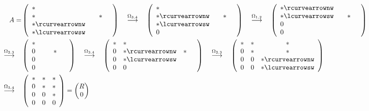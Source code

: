 \begin{align*}
A= &
\left(\begin{array}{lccc}
*~ &&&\\
* &&* \\
* \rcurvearrownw \\ * \lcurvearrowsw
\end{array}\right)
\quad \overset{\Omega_{3,4}}{\longrightarrow} \quad
\left(\begin{array}{lccc}
*~ &&&\\
* \rcurvearrownw && *\\
* \lcurvearrowsw \\
0
\end{array}\right)
\quad \overset{\Omega_{1,2}}{\longrightarrow} \quad
\left(\begin{array}{lccc}
* \rcurvearrownw\\
* \lcurvearrowsw && *& \\
0 \\
0
\end{array}\right)\\
\quad \overset{\Omega_{2,3}}{\longrightarrow} \quad
&\left(\begin{array}{lccc}
*~~ \\
0 && *&~ \\
0 \\
0
\end{array}\right)
\quad \overset{\Omega_{3,4}}{\longrightarrow} \quad	
\left(\begin{array}{clcc}
* & *\\
0 & *  \rcurvearrownw  & *& \\
0 & * \lcurvearrowsw \\
0 & 0
\end{array}\right)
\quad \overset{\Omega_{2,3}}{\longrightarrow} \quad	
\left(\begin{array}{cccl}
* & *  & * \\
0 & *  & * \\ 
0 & 0 & * \rcurvearrownw\\
0 & 0 & *  \lcurvearrowsw 
\end{array}\right) \\
\quad \overset{\Omega_{3,4}}{\longrightarrow} \quad	
& \left(\begin{array}{cccc}
* & *  & *  \\
0 & *  & * \\ 
0 & 0 & * \\
0 & 0 & 0
\end{array}\right)
= \begin{pmatrix}
R \\ 0 
\end{pmatrix}
\end{align*}


